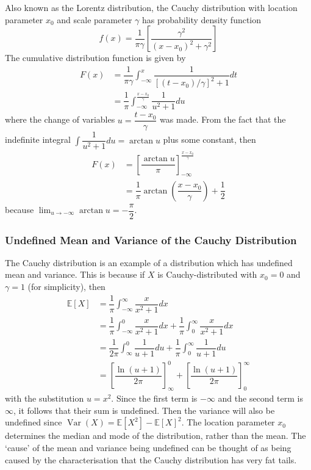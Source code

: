 \documentclass[11pt]{report} %
\begin{document}
Also known as the Lorentz distribution, the Cauchy distribution with location parameter $x_{0}$ and scale parameter $\gamma$ has probability density function
\begin{equation}
f\left(x\right) = \dfrac{1}{\pi\gamma}\left[\dfrac{\gamma^{2}}{\left(x - x_{0}\right)^{2} + \gamma^{2}}\right]
\end{equation}
The cumulative distribution function is given by
\begin{align}
F\left(x\right) &= \dfrac{1}{\pi\gamma}\int_{-\infty}^{x}\dfrac{1}{\left[\left(t - x_{0}\right)/\gamma\right]^{2} + 1}dt \\
&= \dfrac{1}{\pi}\int_{-\infty}^{\frac{x - x_{0}}{\gamma}}\dfrac{1}{u^{2} + 1}du
\end{align}
where the change of variables $u = \dfrac{t - x_{0}}{\gamma}$ was made. From the fact that the indefinite integral $\int \dfrac{1}{u^{2} + 1}du = \arctan u$ plus some constant, then
\begin{align}
F\left(x\right) &= \left[\dfrac{\arctan u}{\pi}\right]_{-\infty}^{\frac{x - x_{0}}{\gamma}} \\
&= \dfrac{1}{\pi}\arctan\left(\dfrac{x - x_{0}}{\gamma}\right) + \dfrac{1}{2}
\end{align}
because $\lim_{u\to-\infty}\arctan u = -\dfrac{\pi}{2}$.

\subsubsection{Undefined Mean and Variance of the Cauchy Distribution}

The Cauchy distribution is an example of a distribution which has undefined mean and variance. This is because if $X$ is Cauchy-distributed with $x_{0} = 0$ and $\gamma = 1$ (for simplicity), then
\begin{align}
\mathbb{E}\left[X\right] &= \dfrac{1}{\pi}\int_{-\infty}^{\infty}\dfrac{x}{x^{2} + 1}dx \\
&= \dfrac{1}{\pi}\int_{-\infty}^{0}\dfrac{x}{x^{2} + 1}dx + \dfrac{1}{\pi}\int_{0}^{\infty}\dfrac{x}{x^{2} + 1}dx \\
&= \dfrac{1}{2\pi}\int_{\infty}^{0}\dfrac{1}{u + 1}du + \dfrac{1}{\pi}\int_{0}^{\infty}\dfrac{1}{u + 1}du \\
&= \left[\dfrac{\ln\left(u + 1\right)}{2\pi}\right]_{\infty}^{0} + \left[\dfrac{\ln\left(u + 1\right)}{2\pi}\right]_{0}^{\infty}
\end{align}
with the substitution $u = x^{2}$. Since the first term is $-\infty$ and the second term is $\infty$, it follows that their sum is undefined. Then the variance will also be undefined since $\operatorname{Var}\left(X\right) = \mathbb{E}\left[X^{2}\right] - \mathbb{E}\left[X\right]^{2}$. The location parameter $x_{0}$ determines the median and mode of the distribution, rather than the mean. The `cause' of the mean and variance being undefined can be thought of as being caused by the characterisation that the Cauchy distribution has very fat tails.
\end{document}
